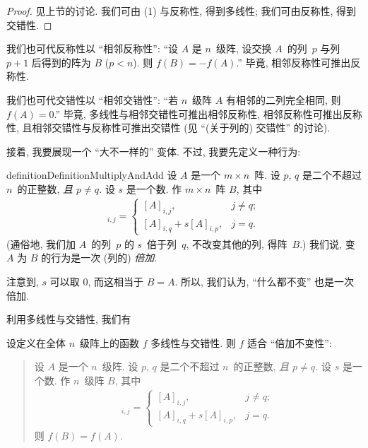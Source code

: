 \begin{proof}
    见上节的讨论.
    我们可由 (1) 与反称性,
    得到多线性;
    我们可由反称性,
    得到交错性.
\end{proof}

我们也可代反称性以 ``相邻反称性'':
``设 \(A\) 是 \(n\)~级阵,
设交换 \(A\)~的列~\(p\) 与列~\(p+1\) 后得到的阵为 \(B\)
(\(p < n\)).
则 \(f(B) = -f(A)\).''
毕竟, 相邻反称性可推出反称性.

我们也可代交错性以 ``相邻交错性'':
``若 \(n\)~级阵 \(A\) 有相邻的二列完全相同,
则 \(f(A) = 0\).''
毕竟, 多线性与相邻交错性可推出相邻反称性,
相邻反称性可推出反称性,
且相邻交错性与反称性可推出交错性
(见 ``(关于列的) 交错性'' 的讨论).

接着, 我要展现一个 ``大不一样的'' 变体.
不过, 我要先定义一种行为:

\begin{restatable}[倍加]{definition}{DefinitionMultiplyAndAdd}
    设 \(A\) 是一个 \(m \times n\)~阵.
    设 \(p\), \(q\) 是二个不超过 \(n\)~的正整数,
    \emph{且 \(p \neq q\).}
    设 \(s\) 是一个数.
    作 \(m \times n\)~阵 \(B\), 其中
    \begin{align*}
        [B]_{i,j}
        = \begin{cases}
              [A]_{i,j},              & j \neq q; \\
              [A]_{i,q} + s[A]_{i,p}, & j = q.
          \end{cases}
    \end{align*}
    (通俗地,
    我们加 \(A\)~的列~\(p\) 的 \(s\)~倍于列~\(q\),
    不改变其他的列,
    得阵~\(B\).)
    我们说, 变 \(A\) 为 \(B\) 的行为是一次 (列的) \emph{倍加}.
\end{restatable}

注意到, \(s\) 可以取 \(0\),
而这相当于 \(B = A\).
所以, 我们认为, ``什么都不变'' 也是一次倍加.

利用多线性与交错性, 我们有

\begin{theorem}
    设定义在全体 \(n\)~级阵上的函数 \(f\)
    多线性与交错性.
    则 \(f\) 适合 ``倍加不变性'':
    \begin{quotation}
        设 \(A\) 是一个 \(n\)~级阵.
        设 \(p\), \(q\) 是二个不超过 \(n\)~的正整数,
        \emph{且 \(p \neq q\).}
        设 \(s\) 是一个数.
        作 \(n\)~级阵 \(B\), 其中
        \begin{align*}
            [B]_{i,j}
            = \begin{cases}
                  [A]_{i,j},              & j \neq q; \\
                  [A]_{i,q} + s[A]_{i,p}, & j = q.
              \end{cases}
        \end{align*}
        则 \(f(B) = f(A)\).
    \end{quotation}
\end{theorem}

